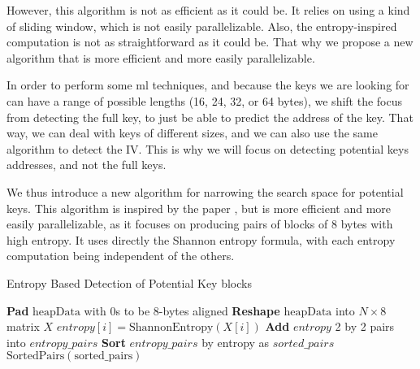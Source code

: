     However, this algorithm is not as efficient as it could be. It relies on using a kind of sliding window, which is not easily parallelizable. Also, the entropy-inspired computation is not as straightforward as it could be. That why we propose a new algorithm that is more efficient and more easily parallelizable.

    In order to perform some \acrshort{ml} techniques, and because the keys we are looking for can have a range of possible lengths (16, 24, 32, or 64 bytes), we shift the focus from detecting the full key, to just be able to predict the address of the key. That way, we can deal with keys of different sizes, and we can also use the same algorithm to detect the IV. This is why we will focus on detecting potential keys addresses, and not the full keys.

    We thus introduce a new algorithm for narrowing the search space for potential keys. This algorithm is inspired by the paper , but is more efficient and more easily parallelizable, as it focuses on producing pairs of blocks of 8 bytes with high entropy. It uses directly the Shannon entropy formula, with each entropy computation being independent of the others.

    \begin{algorithm}
        \caption{Entropy Based Detection of Potential Key blocks}
        \begin{algorithmic}[1]
            \State \textbf{Pad} $\text{heapData}$ with 0s to be 8-bytes aligned
            \State \textbf{Reshape} $\text{heapData}$ into $N \times 8$ matrix $X$
                \State $entropy[i] = \text{ShannonEntropy}(X[i])$ 
            \EndFor
            \State \textbf{Add} $entropy$ 2 by 2 pairs into $entropy\_pairs$ 
            \State \textbf{Sort} $entropy\_pairs$ by entropy as $sorted\_pairs$
            \State \Return $\text{SortedPairs}(\text{sorted\_pairs})$
        \EndProcedure
        \end{algorithmic}
    \end{algorithm}


